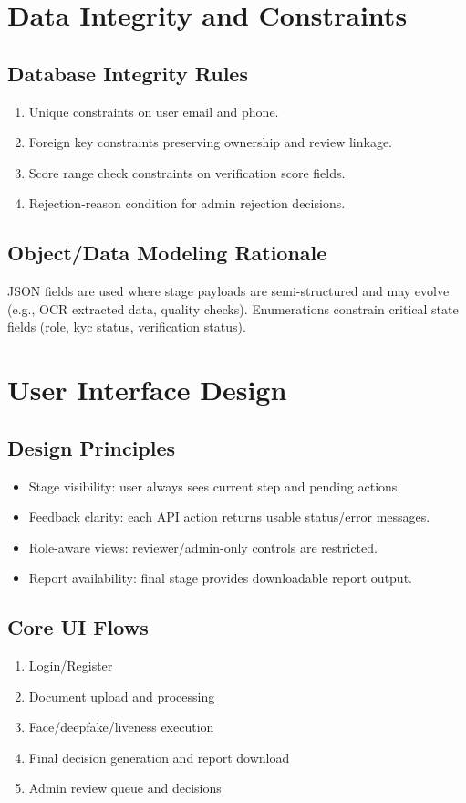 \section{Data Integrity and Constraints}
\subsection{Database Integrity Rules}
\begin{enumerate}
\item Unique constraints on user email and phone.
\item Foreign key constraints preserving ownership and review linkage.
\item Score range check constraints on verification score fields.
\item Rejection-reason condition for admin rejection decisions.
\end{enumerate}

\subsection{Object/Data Modeling Rationale}
JSON fields are used where stage payloads are semi-structured and may evolve (e.g., OCR extracted data, quality checks). Enumerations constrain critical state fields (role, kyc status, verification status).

\section{User Interface Design}
\subsection{Design Principles}
\begin{itemize}
\item Stage visibility: user always sees current step and pending actions.
\item Feedback clarity: each API action returns usable status/error messages.
\item Role-aware views: reviewer/admin-only controls are restricted.
\item Report availability: final stage provides downloadable report output.
\end{itemize}

\subsection{Core UI Flows}
\begin{enumerate}
\item Login/Register
\item Document upload and processing
\item Face/deepfake/liveness execution
\item Final decision generation and report download
\item Admin review queue and decisions
\end{enumerate}

